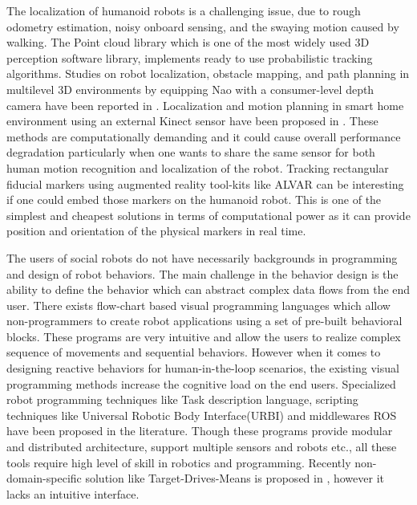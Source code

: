 \documentclass{llncs}
\begin{document}
	The localization of humanoid robots is a challenging issue, due to rough odometry estimation, noisy onboard sensing, and the swaying motion caused by walking\cite{Cervera2012}. The Point cloud library\cite{RusuPCL11} which is one of the most widely used 3D perception software library, implements ready to use probabilistic tracking algorithms. Studies on robot localization, obstacle mapping, and path planning in multilevel 3D environments by equipping Nao with a consumer-level depth camera have been reported in \cite{Maier2012}. Localization and motion planning in smart home environment using an external Kinect sensor have been proposed in \cite{Cervera2012}. These methods are computationally demanding and it could cause overall performance degradation particularly when one wants to share the same sensor for both human motion recognition and localization of the robot. Tracking rectangular fiducial markers using  augmented reality tool-kits like ALVAR\cite{ALVAR} can be interesting if one could embed those markers on the humanoid robot. This is one of the simplest and cheapest solutions in terms of computational power as it can provide position and orientation of the physical markers in real time.
	
	The users of social robots do not have necessarily backgrounds in programming and design of robot behaviors. The main challenge in the behavior design is the ability to define the behavior which can abstract complex data flows from the end user. There exists flow-chart based visual programming languages\cite{Choregraphe} which allow non-programmers to create robot applications using a set of pre-built behavioral blocks. These programs are very intuitive and allow the users to realize complex sequence of movements and sequential behaviors. However when it comes to designing reactive behaviors for human-in-the-loop scenarios, the existing visual programming methods increase the cognitive load on the end users. Specialized robot programming techniques like Task description language\cite{Simmons724883}, scripting techniques like Universal Robotic Body Interface(URBI)\cite{Baillie4814281} and middlewares ROS\cite{quigley2009ros} have been proposed in the literature. Though these programs provide modular and distributed architecture, support multiple sensors and robots etc., all these tools require high level of skill in robotics and programming. Recently non-domain-specific solution like Target-Drives-Means is proposed in \cite{BerenzTDM2014}, however it lacks an intuitive interface.
	
\end{document}
